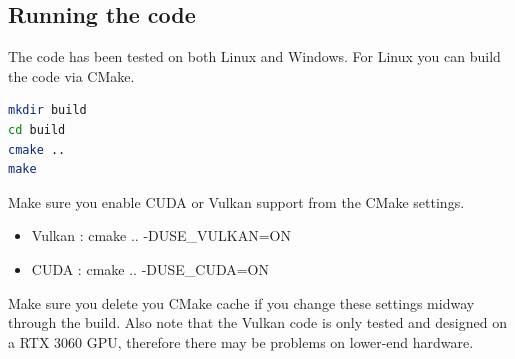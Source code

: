 \documentclass{article}
\begin{document}
\subsection{Running the code}
The code has been tested on both Linux and Windows. For Linux you can build the code via CMake.
\begin{lstlisting}[language=bash,frame=single]
mkdir build
cd build
cmake ..
make
\end{lstlisting}
Make sure you enable CUDA or Vulkan support from the CMake settings.
\begin{itemize}
    \item Vulkan : cmake .. -DUSE\_VULKAN=ON
    \item CUDA : cmake .. -DUSE\_CUDA=ON
\end{itemize}
Make sure you delete you CMake cache if you change these settings midway through the build. \newline
Also note that the Vulkan code is only tested and designed on a RTX 3060 GPU, therefore there may be problems on lower-end hardware.
\end{document}
